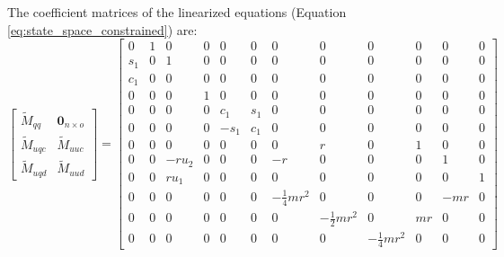 \documentclass[smallcondensed]{svjour3}                     %
\begin{document}
The coefficient matrices of the linearized equations (Equation
\ref{eq:state_space_constrained}) are:
\begin{equation}
  \left[
    \begin{array}{cc}
      \tilde{M}_{qq} & \bm{0}_{n \times o} \\
      \tilde{M}_{uqc} & \tilde{M}_{uuc} \\
      \tilde{M}_{uqd} & \tilde{M}_{uud}
    \end{array}
    \right]=
\left[\begin{smallmatrix}0 & 1 & 0 & 0 & 0 & 0 & 0 & 0 & 0 & 0 & 0 & 0\\s_{1} & 0 & 1 & 0 & 0 & 0 & 0 & 0 & 0 & 0 & 0 & 0\\c_{1} & 0 & 0 & 0 & 0 & 0 & 0 & 0 & 0 & 0 & 0 & 0\\0 & 0 & 0 & 1 & 0 & 0 & 0 & 0 & 0 & 0 & 0 & 0\\0 & 0 & 0 & 0 & c_{1} & s_{1} & 0 & 0 & 0 & 0 & 0 & 0\\0 & 0 & 0 & 0 & - s_{1} & c_{1} & 0 & 0 & 0 & 0 & 0 & 0\\0 & 0 & 0 & 0 & 0 & 0 & 0 & r & 0 & 1 & 0 & 0\\0 & 0 & - r u_{2} & 0 & 0 & 0 & - r & 0 & 0 & 0 & 1 & 0\\0 & 0 & r u_{1} & 0 & 0 & 0 & 0 & 0 & 0 & 0 & 0 & 1\\0 & 0 & 0 & 0 & 0 & 0 & - \frac{1}{4} m r^{2} & 0 & 0 & 0 & - m r & 0\\0 & 0 & 0 & 0 & 0 & 0 & 0 & - \frac{1}{2} m r^{2} & 0 & m r & 0 & 0\\0 & 0 & 0 & 0 & 0 & 0 & 0 & 0 & - \frac{1}{4} m r^{2} & 0 & 0 & 0\end{smallmatrix}\right]
\end{equation}
\end{document}
